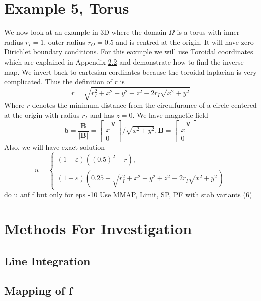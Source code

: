 \documentclass[12pt,a4paper]{article}
\begin{document}
\section{Example 5, Torus}
We now look at an example in 3D where the domain $\Omega $ is a torus with inner radius $r_I = 1$, outer radius $r_O = 0.5$ and is centred at the origin. It will have zero Dirichlet boundary conditions. For this eaxmple we will use Toroidal coordinates which are explained in Appendix \ref{} and demonstrate how to find the inverse map. We invert back to cartesian cordinates because the toroidal laplacian \cite{} is very complicated. Thus the definition of $r$ is
\begin{equation}
r = \sqrt{r_I^2 + x^2 + y^2 + z^2 -2r_I\sqrt{x^2+y^2}}
\end{equation}
Where $r$ denotes the minimum distance from the circulfurance of a circle centered at the origin with radius $r_I$ and has $z=0$. We have magnetic field 
\begin{equation}
\mathbf{b} = \frac{\mathbf{B}}{|\mathbf{B}|} = 
\left[ \begin{matrix}
-y\\
 x \\
 0
\end{matrix} \right]/\sqrt{x^2+y^2}, 
\mathbf{B} = \left[ \begin{matrix}
-y\\
 x\\
 0
\end{matrix} \right]
\end{equation}
Also, we will have exact solution
\begin{equation}
u = 
\begin{cases}
(1+\varepsilon)((0.5)^2 - r ),\\
(1+\varepsilon)(0.25 -  \sqrt{r_I^2 + x^2 + y^2 + z^2 -2r_I\sqrt{x^2+y^2}})
\end{cases}
\end{equation}
do u anf f but only for eps -10
Use MMAP, Limit, SP, PF
with stab variants (6)
\section{Methods For Investigation}

\subsection{Line Integration}


\subsection{Mapping of f}
\end{document}
